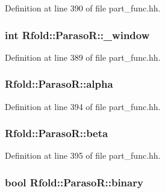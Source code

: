 Definition at line 390 of file part\+\_\+func.\+hh.

\hypertarget{class_rfold_1_1_paraso_r_a6b2fc60e2c500a03bf48d442cb11002c}{
\subsubsection[{\+\_\+window}]{\setlength{\rightskip}{0pt plus 5cm}int Rfold\+::\+Paraso\+R\+::\+\_\+window}}\label{class_rfold_1_1_paraso_r_a6b2fc60e2c500a03bf48d442cb11002c}


Definition at line 389 of file part\+\_\+func.\+hh.

\hypertarget{class_rfold_1_1_paraso_r_a9f5a209eb1cd9de0f4f01c23f4f5e111}{
\subsubsection[{alpha}]{ Rfold\+::\+Paraso\+R\+::alpha}}\label{class_rfold_1_1_paraso_r_a9f5a209eb1cd9de0f4f01c23f4f5e111}


Definition at line 394 of file part\+\_\+func.\+hh.

\hypertarget{class_rfold_1_1_paraso_r_a4ebc3071b4f1aa34c75af71d88cf7382}{
\subsubsection[{beta}]{ Rfold\+::\+Paraso\+R\+::beta}}\label{class_rfold_1_1_paraso_r_a4ebc3071b4f1aa34c75af71d88cf7382}


Definition at line 395 of file part\+\_\+func.\+hh.

\hypertarget{class_rfold_1_1_paraso_r_af2bb3eef2ea5d6f92d490f2a36c8ab64}{
\subsubsection[{binary}]{\setlength{\rightskip}{0pt plus 5cm}bool Rfold\+::\+Paraso\+R\+::binary}}\label{class_rfold_1_1_paraso_r_af2bb3eef2ea5d6f92d490f2a36c8ab64}



